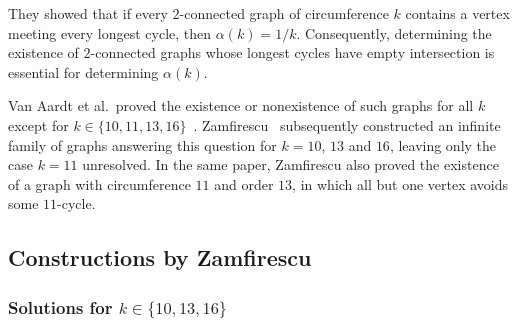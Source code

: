 They showed that if every $2$-connected graph of circumference $k$ contains a vertex meeting every longest cycle, then $\alpha(k)=1/k$. Consequently, determining the existence of $2$-connected graphs whose longest cycles have empty intersection is essential for determining $\alpha(k)$.

Van Aardt et al.\ proved the existence or nonexistence of such graphs for all $k$ except for $k\in\{10,11,13,16\}$~\cite{article:van-aardt}. Zamfirescu~\cite{article:zamfirescu} subsequently constructed an infinite family of graphs answering this question for $k=10$, $13$ and $16$, leaving only the case $k=11$ unresolved. In the same paper, Zamfirescu also proved the existence of a graph with circumference $11$ and order $13$, in which all but one vertex avoids some $11$-cycle.

\subsection{Constructions by Zamfirescu}

\subsubsection{Solutions for $k \in \{10, 13, 16\}$}
\label{sec:tube-graph}

